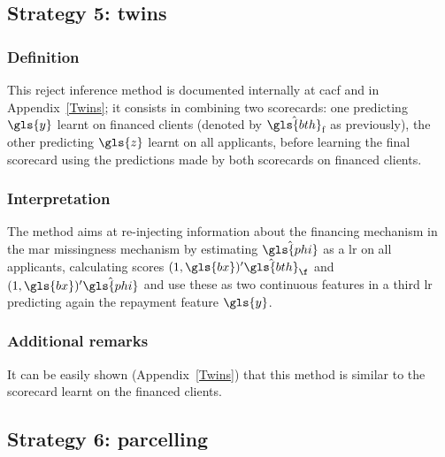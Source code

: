 \subsection{Strategy 5: twins}

\subsubsection{Definition}
This {reject inference} method is documented internally at \gls{cacf} and in Appendix~\ref{Twins}; it consists in combining two scorecards: one predicting $\gls{y}$ learnt on financed clients (denoted by $\hat{\gls{bth}}_{\text{f}}$ as previously), the other predicting $\gls{z}$ learnt on all applicants, before learning the final scorecard using the predictions made by both scorecards on financed clients.

\subsubsection{Interpretation}
The method aims at re-injecting information about the financing mechanism in the \gls{mar} missingness mechanism by estimating $\hat{\gls{phi}}$ as a \gls{lr} on all applicants, calculating \gls{score}s $(1,\gls{bx})' \hat{\gls{bth}}_\f$ and $(1,\gls{bx})' \hat{\gls{phi}}$ and use these as two continuous features in a third \gls{lr} predicting again the repayment feature $\gls{y}$.

\subsubsection{Additional remarks}
It can be easily shown (Appendix~\ref{Twins}) that
this method is similar to the scorecard learnt on the financed clients.

\subsection{Strategy 6: parcelling} \label{subsec:parcel}

